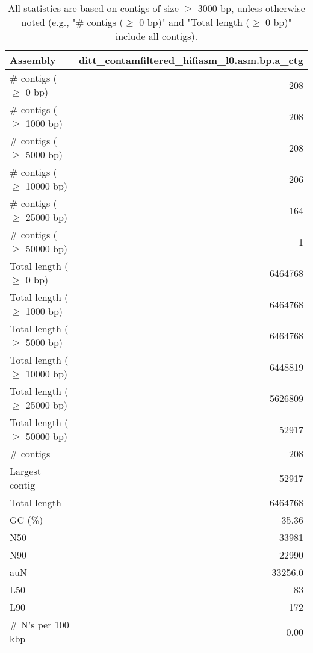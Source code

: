 \documentclass[12pt,a4paper]{article}
\begin{document}
\begin{table}[ht]
\begin{center}
\caption{All statistics are based on contigs of size $\geq$ 3000 bp, unless otherwise noted (e.g., "\# contigs ($\geq$ 0 bp)" and "Total length ($\geq$ 0 bp)" include all contigs).}
\begin{tabular}{|l*{1}{|r}|}
\hline
Assembly & ditt\_contamfiltered\_hifiasm\_l0.asm.bp.a\_ctg \\ \hline
\# contigs ($\geq$ 0 bp) & 208 \\ \hline
\# contigs ($\geq$ 1000 bp) & 208 \\ \hline
\# contigs ($\geq$ 5000 bp) & 208 \\ \hline
\# contigs ($\geq$ 10000 bp) & 206 \\ \hline
\# contigs ($\geq$ 25000 bp) & 164 \\ \hline
\# contigs ($\geq$ 50000 bp) & 1 \\ \hline
Total length ($\geq$ 0 bp) & 6464768 \\ \hline
Total length ($\geq$ 1000 bp) & 6464768 \\ \hline
Total length ($\geq$ 5000 bp) & 6464768 \\ \hline
Total length ($\geq$ 10000 bp) & 6448819 \\ \hline
Total length ($\geq$ 25000 bp) & 5626809 \\ \hline
Total length ($\geq$ 50000 bp) & 52917 \\ \hline
\# contigs & 208 \\ \hline
Largest contig & 52917 \\ \hline
Total length & 6464768 \\ \hline
GC (\%) & 35.36 \\ \hline
N50 & 33981 \\ \hline
N90 & 22990 \\ \hline
auN & 33256.0 \\ \hline
L50 & 83 \\ \hline
L90 & 172 \\ \hline
\# N's per 100 kbp & 0.00 \\ \hline
\end{tabular}
\end{center}
\end{table}
\end{document}
